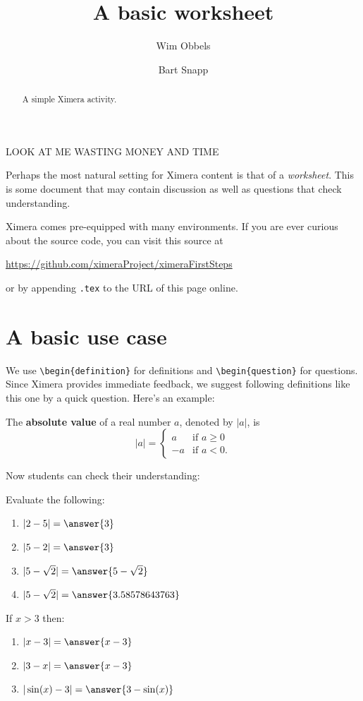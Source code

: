 \documentclass{ximera}
\title{A basic worksheet}
\author{Wim Obbels \and Bart Snapp}
\begin{document}
\begin{abstract}
    A simple Ximera activity.
\end{abstract}
\maketitle
\label{xim:aFirstActivity}

{\huge LOOK AT ME WASTING MONEY AND TIME}

Perhaps the most natural setting for Ximera content is that of a
\textit{worksheet}. This is some document that may contain discussion as well
as questions that check understanding.

Ximera comes pre-equipped with many environments.  If you are ever curious about
the source code, you can visit this source at

\begin{center}
    \url{https://github.com/ximeraProject/ximeraFirstSteps}
\end{center}
or by appending \verb|.tex| to the URL of this page online. 


\section{A basic use case}
We use \verb|\begin{definition}| for definitions and \verb|\begin{question}| for
questions. Since Ximera provides immediate feedback, we suggest following
definitions like this one by a quick question. Here's an example:

\begin{definition}\label{def:absolute_value}
    The \textbf{absolute value} of a real number $a$, denoted by $|a|$, is
    \[
        |a| = \begin{cases}
            a  & \text{if $a \geq 0$} \\
            -a & \text{if $a<0$.}
        \end{cases}
    \]
\end{definition}
Now students can check their understanding:

\begin{question}
    Evaluate the following:
    \begin{enumerate}
        \item $|2-5| = \answer{3}$
        \item $|5-2| = \answer{3}$
        \item $|5-\sqrt{2}| = \answer{5-\sqrt{2}}$
        \item $|5-\sqrt{2}| = \answer{3.58578643763}$
    \end{enumerate}
    If $x > 3$ then:
    \begin{enumerate}
        \item $|x - 3| = \answer{x - 3}$
        \item $|3 - x| = \answer{x - 3}$
        \item $|\sin(x) - 3| = \answer{3 - \sin(x)}$
    \end{enumerate}
\end{question}
\end{document}
